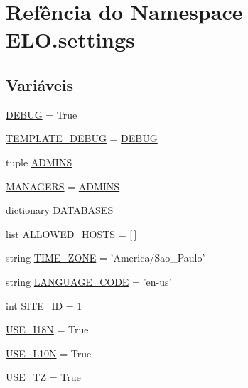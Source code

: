 \hypertarget{namespaceELO_1_1settings}{\section{Refência do Namespace E\-L\-O.\-settings}
\label{namespaceELO_1_1settings}
}
\subsection*{Variáveis}
\begin{DoxyCompactItemize}
\item 
\hyperlink{namespaceELO_1_1settings_a62f457ac29cc6f3e85282c71ce3b4f26}{D\-E\-B\-U\-G} = True
\item 
\hyperlink{namespaceELO_1_1settings_a014930e0bf77feccc65c20212593381e}{T\-E\-M\-P\-L\-A\-T\-E\-\_\-\-D\-E\-B\-U\-G} = \hyperlink{namespaceELO_1_1settings_a62f457ac29cc6f3e85282c71ce3b4f26}{D\-E\-B\-U\-G}
\item 
tuple \hyperlink{namespaceELO_1_1settings_a051220bd8105ba13b2720df11c1950ba}{A\-D\-M\-I\-N\-S}
\item 
\hyperlink{namespaceELO_1_1settings_a43e8826e0b24e337065b4975f3eace4c}{M\-A\-N\-A\-G\-E\-R\-S} = \hyperlink{namespaceELO_1_1settings_a051220bd8105ba13b2720df11c1950ba}{A\-D\-M\-I\-N\-S}
\item 
dictionary \hyperlink{namespaceELO_1_1settings_a91ed1425b7f1cf041960832ce5b54b6e}{D\-A\-T\-A\-B\-A\-S\-E\-S}
\item 
list \hyperlink{namespaceELO_1_1settings_afd72644768367440ae1a89e9fe95cde5}{A\-L\-L\-O\-W\-E\-D\-\_\-\-H\-O\-S\-T\-S} = \mbox{[}$\,$\mbox{]}
\item 
string \hyperlink{namespaceELO_1_1settings_aafd318ffa70db1890eaf1f8621e19d53}{T\-I\-M\-E\-\_\-\-Z\-O\-N\-E} = 'America/Sao\-\_\-\-Paulo'
\item 
string \hyperlink{namespaceELO_1_1settings_a388841a63bae5418e55fb741f938d4fb}{L\-A\-N\-G\-U\-A\-G\-E\-\_\-\-C\-O\-D\-E} = 'en-\/us'
\item 
int \hyperlink{namespaceELO_1_1settings_a31328123344da3768e97b0ac61c342de}{S\-I\-T\-E\-\_\-\-I\-D} = 1
\item 
\hyperlink{namespaceELO_1_1settings_a2d03ced1be44b9d7937bdbc870474ffe}{U\-S\-E\-\_\-\-I18\-N} = True
\item 
\hyperlink{namespaceELO_1_1settings_a863197f2699808509a4c32b38c16eb44}{U\-S\-E\-\_\-\-L10\-N} = True
\item 
\hyperlink{namespaceELO_1_1settings_a8da4c6fc66af84d08bddc0249a473553}{U\-S\-E\-\_\-\-T\-Z} = True

\end{DoxyCompactItemize}
